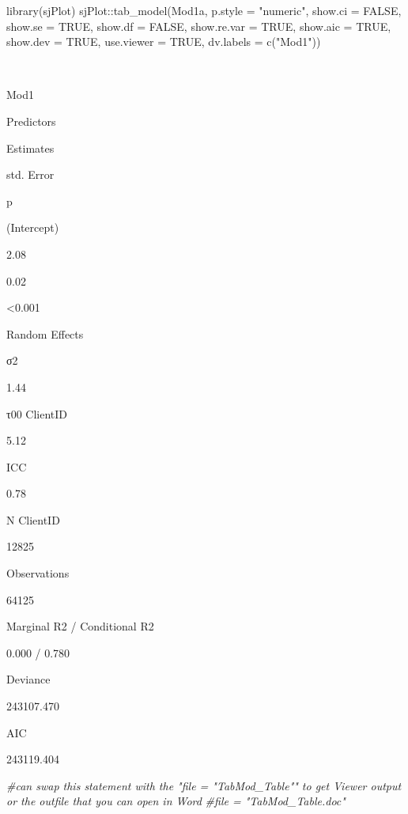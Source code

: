 \documentclass[
  11pt,
]{book}
\newenvironment{Shaded}{\begin{snugshade}}{\end{snugshade}}
\newcommand{\AttributeTok}[1]{\textcolor[rgb]{0.77,0.63,0.00}{#1}}
\newcommand{\CommentTok}[1]{\textcolor[rgb]{0.56,0.35,0.01}{\textit{#1}}}
\newcommand{\ConstantTok}[1]{\textcolor[rgb]{0.00,0.00,0.00}{#1}}
\newcommand{\FunctionTok}[1]{\textcolor[rgb]{0.00,0.00,0.00}{#1}}
\newcommand{\NormalTok}[1]{#1}
\newcommand{\SpecialCharTok}[1]{\textcolor[rgb]{0.00,0.00,0.00}{#1}}
\newcommand{\StringTok}[1]{\textcolor[rgb]{0.31,0.60,0.02}{#1}}
\begin{document}
\begin{Shaded}
\begin{Highlighting}[]
\FunctionTok{library}\NormalTok{(sjPlot)}
\NormalTok{sjPlot}\SpecialCharTok{::}\FunctionTok{tab\_model}\NormalTok{(Mod1a, }\AttributeTok{p.style =} \StringTok{"numeric"}\NormalTok{, }\AttributeTok{show.ci =} \ConstantTok{FALSE}\NormalTok{, }\AttributeTok{show.se =} \ConstantTok{TRUE}\NormalTok{, }\AttributeTok{show.df =} \ConstantTok{FALSE}\NormalTok{, }\AttributeTok{show.re.var =} \ConstantTok{TRUE}\NormalTok{, }\AttributeTok{show.aic =} \ConstantTok{TRUE}\NormalTok{, }\AttributeTok{show.dev =} \ConstantTok{TRUE}\NormalTok{, }\AttributeTok{use.viewer =} \ConstantTok{TRUE}\NormalTok{, }\AttributeTok{dv.labels =} \FunctionTok{c}\NormalTok{(}\StringTok{"Mod1"}\NormalTok{))}
\end{Highlighting}
\end{Shaded}

~

Mod1

Predictors

Estimates

std. Error

p

(Intercept)

2.08

0.02

\textless0.001

Random Effects

σ2

1.44

τ00 ClientID

5.12

ICC

0.78

N ClientID

12825

Observations

64125

Marginal R2 / Conditional R2

0.000 / 0.780

Deviance

243107.470

AIC

243119.404

\begin{Shaded}
\begin{Highlighting}[]
\CommentTok{\#can swap this statement with the "file = "TabMod\_Table"" to get Viewer output or the outfile that you can open in Word}
\CommentTok{\#file = "TabMod\_Table.doc"}
\end{Highlighting}
\end{Shaded}
\end{document}
